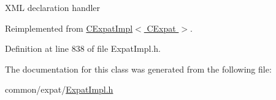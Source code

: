 \-X\-M\-L declaration handler 



\-Reimplemented from \hyperlink{class_c_expat_impl_a852c68ceb2b2527ff04a245eeac51dfa}{\-C\-Expat\-Impl$<$ C\-Expat $>$}.



\-Definition at line 838 of file \-Expat\-Impl.\-h.



\-The documentation for this class was generated from the following file\-:\begin{DoxyCompactItemize}
\item 
common/expat/\hyperlink{_expat_impl_8h}{\-Expat\-Impl.\-h}\end{DoxyCompactItemize}

